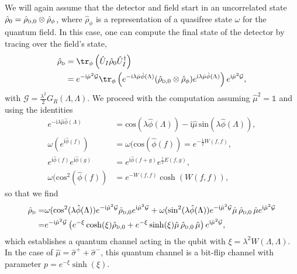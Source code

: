\documentclass[letterpaper,12pt,titlepage,oneside,final]{book}
\newcommand{\openone}{\mathds{1}}
\newcommand{\ii}{\mathrm{i}}
\newcommand{\tc}[1]{\textsc{#1}}
\begin{document}
We will again assume that the detector and field start in an uncorrelated state $\hat{\rho}_0 = \hat{\rho}_{\tc{d},0}\otimes \hat{\rho}_\phi$, where $\hat{\rho}_\phi$ is a representation of a quasifree state $\omega$ for the quantum field. In this case, one can compute the final state of the detector by tracing over the field's state,
\begin{align}
    \hat{\rho}_\tc{d} &= \tr_\phi\left(\hat{U}_I\hat{\rho}_0\hat{U}_I^\dagger\right) \\&= e^{- \ii \hat{\mu}^2 \mathcal{G}}\tr_\phi\left( e^{- \ii \lambda \hat{\mu} \hat{\phi}(\Lambda)}(\hat{\rho}_{\tc{d},0}\otimes \hat{\rho}_\phi )e^{\ii \lambda \hat{\mu} \hat{\phi}(\Lambda)}\right)e^{\ii \hat{\mu}^2 \mathcal{G}}\nonumber,
\end{align}
with $\mathcal{G} = \frac{\lambda^2}{2} G_R(\Lambda,\Lambda)$. We proceed with the computation assuming $\hat{\mu}^2 = \openone$ and using the identities 
\begin{align}
    e^{-\ii \lambda \hat{\mu} \hat{\phi}(\Lambda)} &= \text{cos} 
 (\lambda\hat{\phi}(\Lambda)) - \ii \hat{\mu} \,\text{sin}(\lambda \hat{\phi}(\Lambda)),\nonumber\\
    \omega(e^{\ii \hat{\phi}(f)}) &= \omega(\text{cos}(\hat{\phi}(f)) = e^{-\frac{1}{2}W(f,f)},\nonumber\\
    e^{\ii \hat{\phi}(f)}e^{\ii \hat{\phi}(g)} &= e^{\ii \hat{\phi}(f+g)}e^{\frac{\ii}{2}E(f,g)},\nonumber\\
    \omega(\text{cos}^2(\hat{\phi}(f)) &= e^{-W(f,f)}\cosh(W(f,f)),\label{eq:identities}
\end{align}
so that we find
\begin{align}
    \hat{\rho}_\tc{d} =& \omega(\text{cos}^2(\lambda \hat{\phi}(\Lambda)) e^{- \ii \hat{\mu}^2 \mathcal{G}} \hat{\rho}_{\tc{d},0} e^{\ii\hat{\mu}^2 \mathcal{G}}
    + \omega(\text{sin}^2(\lambda \hat{\phi}(\Lambda)) e^{- \ii \hat{\mu}^2 \mathcal{G}} \hat{\mu}\,\hat{\rho}_{\tc{d},0}\,\hat{\mu}e^{\ii \hat{\mu}^2 \mathcal{G}}\label{eq:finalstategapless}\\
    =& e^{- \ii \hat{\mu}^2 \mathcal{G}} \left(e^{-\xi}\cosh(\xi)\hat{\rho}_{\tc{d},0} + e^{-\xi}\sinh(\xi)\hat{\mu}\,\hat{\rho}_{\tc{d},0}\,\hat{\mu}\right)e^{\ii \hat{\mu}^2 \mathcal{G}},\nonumber
\end{align}
which establishes a quantum channel acting in the qubit with $\xi = \lambda^2 W(\Lambda,\Lambda)$. In the case of $\hat{\mu}= \hat{\sigma}^++\hat{\sigma}^-$, this quantum channel is a bit-flip channel with parameter \mbox{$p = e^{-\xi}\sinh(\xi)$}.
\end{document}
